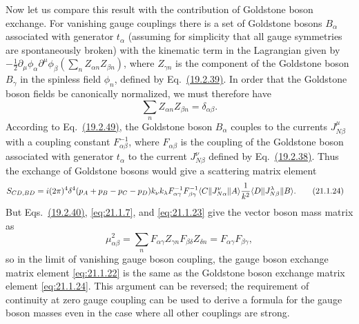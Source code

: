 Now let us compare this result with the contribution of Goldstone boson
exchange. For vanishing gauge couplings there is a set of Goldstone bosons
$B_\alpha$ associated with generator $t_\alpha$ (assuming for simplicity
that all gauge symmetries are spontaneously broken) with the kinematic term
in the Lagrangian given by
$-\frac12\partial_\mu\phi_\alpha\partial^\mu\phi_\beta
\left(\sum_nZ_{\alpha n}Z_{\beta n}\right)$, where $Z_{\gamma n}$ is the
component of the Goldstone boson $B_\gamma$ in the spinless field $\phi_n$,
defined by
Eq.~\hyperref[eq:19.2.39]{(19.2.39)}. In order that the Goldstone boson
fields be canonically normalized, we must therefore have
\begin{equation}
 \sum_n Z_{\alpha n}Z_{\beta n}=\delta_{\alpha\beta}.
 \tag{21.1.23}\label{eq:21.1.23}
\end{equation}
According to Eq.~\hyperref[eq:19.2.49]{(19.2.49)}, the Goldstone boson
$B_\alpha$ couples to the currents $J_{N\beta}^{\mu}$ with a coupling
constant $F^{-1}_{\alpha\beta}$, where $F_{\alpha\beta}$ is the coupling of
the Goldstone boson associated with generator $t_\alpha$ to the current
$J_{N\beta}^{\nu}$ defined by Eq.~\hyperref[eq:19.2.38]{(19.2.38)}. Thus
the exchange of Goldstone bosons would give a scattering matrix element
\begin{align}
 S_{CD,BD}={}&i(2\pi)^4\delta^4(p_A+p_B-p_C-p_D)
 k_\nu k_\lambda
 F^{-1}_{\alpha\gamma}F^{-1}_{\beta\gamma}
 \langle C\rVert J_{N\alpha}^{\nu}\lVert A\rangle
 \frac1{k^2}
 \langle D\rVert J_{N\beta}^{\lambda}\lVert B\rangle.
 \tag{21.1.24}\label{eq:21.1.24}
\end{align}
But Eqs.~\hyperref[eq:19.2.40]{(19.2.40)}, \eqref{eq:21.1.7}, and
\eqref{eq:21.1.23} give the vector boson mass matrix as
\begin{equation}
 \mu^2_{\alpha\beta}
 =\sum_n F_{\alpha\gamma}Z_{\gamma n}
 F_{\beta\delta}Z_{\delta n}
 =F_{\alpha\gamma}F_{\beta\gamma},
 \tag{21.1.25}\label{eq:21.1.25}
\end{equation}
so in the limit of vanishing gauge boson coupling, the gauge boson exchange
matrix element \eqref{eq:21.1.22} is the same as the Goldstone boson
exchange matrix element \eqref{eq:21.1.24}. This argument can be reversed;
the requirement of continuity at zero gauge coupling can be used to derive
a formula for the gauge boson masses even in the case where all other
couplings are strong.
